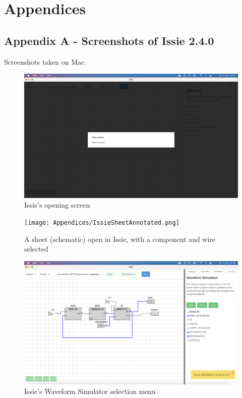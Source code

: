 \chapter{Appendices}

\section{Appendix A - Screenshots of Issie 2.4.0}
Screenshots taken on Mac.

\begin{figure} [h]
    \centering
    \includegraphics[width=\textwidth]{Appendices/IssieOpening.png}
    \caption{Issie's opening screen}
    \label{fig:IssieOpen}
\end{figure}

\begin{figure} [h]
    \centering
    \texttt{[image: Appendices/IssieSheetAnnotated.png]}
    \caption{A sheet (schematic) open in Issie, with a component and wire selected}
    \label{fig:IssieSheetAnnotated}
\end{figure}

\begin{figure} [h]
    \centering
    \includegraphics[width=\textwidth]{Appendices/IssieWaveSimSel.png}
    \caption{Issie's Waveform Simulator selection menu}
    \label{fig:IssieWSSel}
\end{figure}

